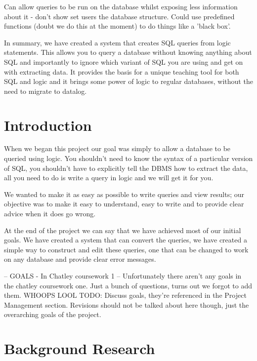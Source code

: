 \documentclass[a4paper, 11pt]{article}
\begin{document}
  Can allow queries to be run on the database whilst exposing less information
  about it - don't show set users the database structure. Could use predefined
  functions (doubt we do this at the moment) to do things like a 'black box'.

  In summary, we have created a system that creates SQL queries from logic 
  statements. This allows you to query a database without knowing anything
  about SQL and importantly to ignore which variant of SQL you
  are using and get on with extracting data. It provides the basis for a
  unique teaching tool for both SQL and logic and it brings some power
  of logic to regular databases, without the need to migrate to datalog.

\section{Introduction}


When we began this project our goal was simply to allow a database to be 
queried using logic. You shouldn't need to know the syntax of a particular
version of SQL, you shouldn't have to explicitly tell the DBMS how to extract
the data, all you need to do is write a query in logic and we will
get it for you.

We wanted to make it as easy as possible to write queries and view results;
our objective was to make it easy to understand, easy to write and to
provide clear advice when it does go wrong.

At the end of the project we can say that we have achieved most of our initial 
goals. We have created a system that can convert the queries, we have created
a simple way to construct and edit these queries, one that can be changed to 
work on any database and provide clear error messages.

  -- GOALS - In Chatley coursework 1 --
  Unfortunately there aren't any goals in the chatley coursework one.
  Just a bunch of questions, turns out we forgot to add them. WHOOPS LOOL
  TODO: Discuss goals, they're referenced in the Project Management
  section. Revisions should not be talked about here though, just the
  overarching goals of the project.

\section{Background Research}
\label{sec:background}
\end{document}
